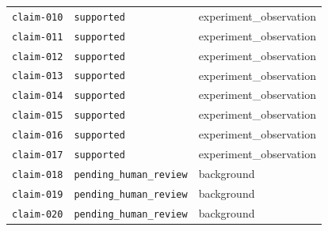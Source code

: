 \documentclass[UTF8]{ctexart}
\begin{document}
\begin{longtable}{@{}>{\raggedright\arraybackslash}p{}>{\raggedright\arraybackslash}p{}>{\raggedright\arraybackslash}p{}@{}}
\texttt{\scriptsize claim-\allowbreak{}010} & \texttt{\scriptsize supported} & experiment\_\allowbreak{}observation \\
\texttt{\scriptsize claim-\allowbreak{}011} & \texttt{\scriptsize supported} & experiment\_\allowbreak{}observation \\
\texttt{\scriptsize claim-\allowbreak{}012} & \texttt{\scriptsize supported} & experiment\_\allowbreak{}observation \\
\texttt{\scriptsize claim-\allowbreak{}013} & \texttt{\scriptsize supported} & experiment\_\allowbreak{}observation \\
\texttt{\scriptsize claim-\allowbreak{}014} & \texttt{\scriptsize supported} & experiment\_\allowbreak{}observation \\
\texttt{\scriptsize claim-\allowbreak{}015} & \texttt{\scriptsize supported} & experiment\_\allowbreak{}observation \\
\texttt{\scriptsize claim-\allowbreak{}016} & \texttt{\scriptsize supported} & experiment\_\allowbreak{}observation \\
\texttt{\scriptsize claim-\allowbreak{}017} & \texttt{\scriptsize supported} & experiment\_\allowbreak{}observation \\
\texttt{\scriptsize claim-\allowbreak{}018} & \texttt{\scriptsize pending\_\allowbreak{}human\_\allowbreak{}review} & background \\
\texttt{\scriptsize claim-\allowbreak{}019} & \texttt{\scriptsize pending\_\allowbreak{}human\_\allowbreak{}review} & background \\
\texttt{\scriptsize claim-\allowbreak{}020} & \texttt{\scriptsize pending\_\allowbreak{}human\_\allowbreak{}review} & background \\
\bottomrule
\end{longtable}
\end{document}
